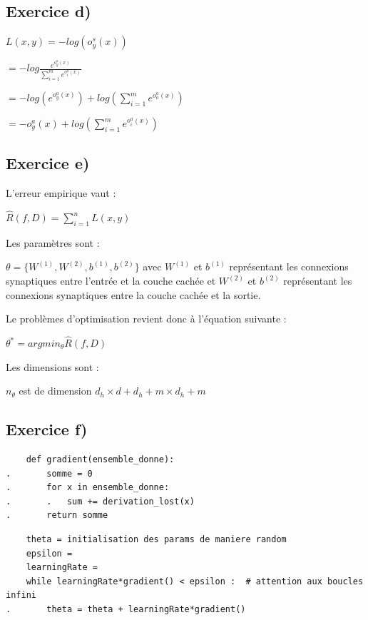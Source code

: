 \documentclass[a4paper,10pt]{article}
\begin{document}
\subsection{Exercice d)}

$ L(x,y) = -log  (o^{s}_{y}(x)) $

$= -log \frac{e^{o^{a}_{y}(x)}}{\sum_{i=1}^{m} e^{o^{a}_{i}(x)}}$ 

$= -log(e^{o^{a}_{y}(x)}) +log(\sum_{i=1}^{m} e^{o^{a}_{o}(x)})  $

$ = -o^{a}_{y}(x) + log(\sum_{i=1}^{m} e^{o^{a}_{i}(x)})$

\subsection{Exercice e)} 

L'erreur empirique vaut :

$\widehat{R}(f,D) = \sum_{i=1}^{n} L(x,y)$


Les paramètres sont :

$ \theta = \{ W^{(1)},W^{(2)},b^{(1)},b^{(2)} \}$ avec $W^{(1)}$ et $b^{(1)}$ représentant les connexions synaptiques entre l'entrée et la couche cachée et $W^{(2)}$ et $b^{(2)}$ représentant les connexions synaptiques entre la couche cachée et la sortie.

Le problèmes d'optimisation revient donc à l'équation suivante :

$\theta^{*} = argmin_{\theta} \widehat{R}(f,D) $

Les dimensions sont :

$n_{\theta}$ est de dimension $d_{h} \times d + d_{h} + m \times d_{h} + m$

\subsection{Exercice f)} 

\begin{verbatim}
	def gradient(ensemble_donne):
.		somme = 0
.		for x in ensemble_donne:
.		.	sum += derivation_lost(x)
.		return somme
\end{verbatim}

\begin{verbatim}
	theta = initialisation des params de maniere random
	epsilon =
	learningRate =
	while learningRate*gradient() < epsilon :  # attention aux boucles infini
.		theta = theta + learningRate*gradient()
\end{verbatim}
\end{document}
